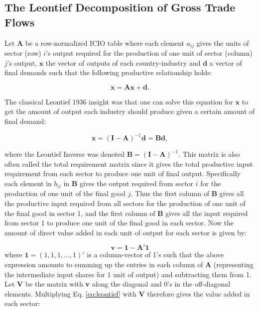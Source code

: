 \documentclass[a4paper]{article}
\begin{document}
\subsection{The Leontief Decomposition of Gross Trade Flows}

Let $\textbf{A}$ be a row-normalized ICIO table where each element $a_{ij}$ gives the units of sector (row) $i$'s output required for the production of one unit of sector (column) $j$'s output, $\textbf{x}$ the vector of outputs of each country-industry and $\textbf{d}$ a vector of final demands such that the following productive relationship holds:

\begin{equation}
\textbf{x} = \textbf{A}\textbf{x} + \textbf{d}.
\end{equation}

The classical Leontief 1936 insight was that one can solve this equation for $\textbf{x}$ to get the amount of output each industry should produce given a certain amount of final demand:

\begin{equation} \label{eq:leontief}
\textbf{x} = (\textbf{I}-\textbf{A})^{-1} \textbf{d} = \textbf{B}\textbf{d},
\end{equation}

where the Leontief Inverse was denoted $\textbf{B} = (\textbf{I}-\textbf{A})^{-1}$. This matrix is also often called the total requirement matrix since it gives the total productive input requirement from each sector to produce one unit of final output. Specifically each element in $b_{ij}$ in \textbf{B} gives the output required from sector $i$ for the production  of one unit of the final good $j$. Thus the first column of \textbf{B} gives all the productive input required from all sectors for the production of one unit of the final good in sector 1, and the first column of \textbf{B} gives all the input required from sector 1 to produce one unit of the final good in each sector. Now the amount of direct value added in each unit of output for each sector is given by:

\begin{equation}
\textbf{v} = \textbf{1} - \textbf{A}'\textbf{1}
\end{equation}
where $\textbf{1} = (1, 1, 1, ..., 1)'$ is a column-vector of 1's such that the above expression amounts to summing up the entries in each column of \textbf{A} (representing the intermediate input shares for 1 unit of output) and subtracting them from 1. Let \textbf{V} be the matrix with \textbf{v} along the diagonal and 0's in the off-diagonal elements. Multiplying Eq. \ref{eq:leontief} with $\textbf{V}$ therefore gives the value added in each sector:
\end{document}
